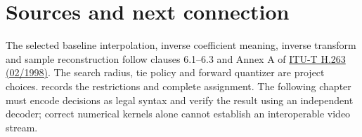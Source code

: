 

\section*{Sources and next connection}

The selected baseline interpolation, inverse coefficient meaning, inverse transform
and sample reconstruction follow clauses 6.1--6.3 and Annex A of
\href{https://www.itu.int/rec/T-REC-H.263-199802-S/en}{ITU-T H.263 (02/1998)}.
The search radius, tie policy and forward quantizer are project choices.
 records the restrictions and complete assignment.
The following chapter must encode decisions as legal syntax and verify the
result using an independent decoder; correct numerical kernels alone cannot
establish an interoperable video stream.
